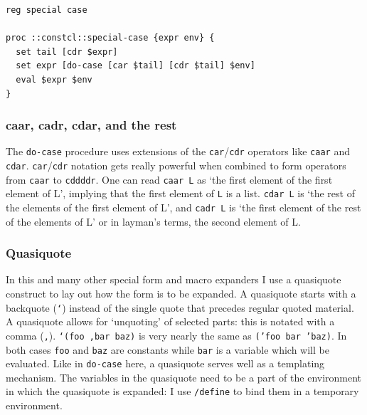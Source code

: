 \documentclass[a5paper,draft]{memoir}
\begin{document}
\begin{lstlisting}
reg special case

proc ::constcl::special-case {expr env} {
  set tail [cdr $expr]
  set expr [do-case [car $tail] [cdr $tail] $env]
  eval $expr $env
}
\end{lstlisting}

\begin{pulledtext}

\subsubsection{caar, cadr, cdar, and the rest}
\label{caar-cadr-cdar-and-the-rest}

The \texttt{do-case} procedure uses extensions of the \texttt{car}/\texttt{cdr} operators like \texttt{caar} and \texttt{cdar}. \texttt{car}/\texttt{cdr} notation gets really powerful when combined to form operators from \texttt{caar} to \texttt{cddddr}. One can read \texttt{caar L} as `the first element of the first element of L', implying that the first element of \texttt{L} is a list. \texttt{cdar L} is `the rest of the elements of the first element of L', and \texttt{cadr L} is `the first element of the rest of the elements of L' or in layman's terms, the second element of L.
\end{pulledtext}

\begin{pulledtext}

\subsubsection{Quasiquote}
\label{quasiquote}

In this and many other special form and macro expanders I use a quasiquote construct to lay out how the form is to be expanded. A quasiquote starts with a backquote (\texttt{`}) instead of the single quote that precedes regular quoted material. A quasiquote allows for `unquoting' of selected parts: this is notated with a comma (\texttt{,}). \texttt{`(foo ,bar baz)} is very nearly the same as \texttt{('foo bar 'baz)}. In both cases \texttt{foo} and \texttt{baz} are constants while \texttt{bar} is a variable which will be evaluated. Like in \texttt{do-case} here, a quasiquote serves well as a templating mechanism. The variables in the quasiquote need to be a part of the environment in which the quasiquote is expanded: I use \texttt{/define} to bind them in a temporary environment.
\end{pulledtext}
\end{document}
